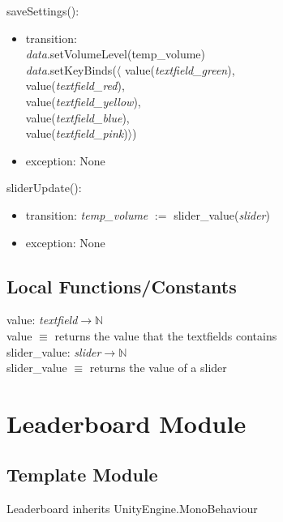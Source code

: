\documentclass[12pt]{article}
\begin{document}
\noindent saveSettings():
\begin{itemize}
	\item transition: \\
	\textit{data}.setVolumeLevel(temp\_volume)\\
	\textit{data}.setKeyBinds($\langle$ value(\textit{textfield\_green}), \\
	\hspace*{3.65cm}value(\textit{textfield\_red}), \\
	\hspace*{3.65cm}value(\textit{textfield\_yellow}), \\
	\hspace*{3.65cm}value(\textit{textfield\_blue}), \\
	\hspace*{3.65cm}value(\textit{textfield\_pink})$\rangle$)
	
	\item exception: None
\end{itemize}

\newpage

\noindent sliderUpdate():
\begin{itemize}
	\item transition: \textit{temp\_volume} $:=$ slider\_value(\textit{slider})
	\item exception: None
\end{itemize}

\subsection{Local Functions/Constants}

value: \textit{textfield}$\rightarrow \mathbb{N}$\\
value $\equiv$ returns the value that the textfields contains\\

\noindent slider\_value: \textit{slider}$\rightarrow \mathbb{N}$\\
slider\_value $\equiv$ returns the value of a slider

\newpage

\section {Leaderboard Module}

\subsection{Template Module}
Leaderboard inherits UnityEngine.MonoBehaviour
\end{document}
